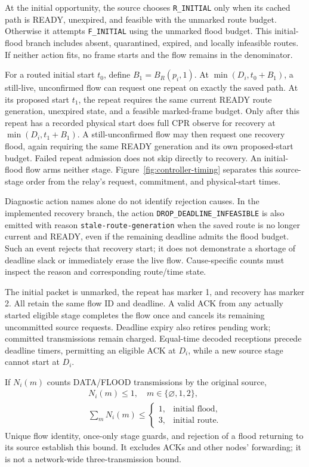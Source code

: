 At the initial opportunity, the source chooses \texttt{R\_INITIAL} only
when its cached path is READY, unexpired, and feasible with the unmarked
route budget. Otherwise it attempts \texttt{F\_INITIAL} using the unmarked
flood budget. This initial-flood branch includes absent, quarantined,
expired, and locally infeasible routes. If neither action fits, no frame
starts and the flow remains in the denominator.

For a routed initial start $t_0$, define $B_1=B_R(p_i,1)$. At
$\min(D_i,t_0+B_1)$, a still-live, unconfirmed flow can request one repeat
on exactly the saved path. At its proposed start $t_1$, the repeat requires
the same current READY route generation, unexpired state, and a feasible
marked-frame budget. Only after this repeat has a recorded physical start
does full CPR observe for recovery at $\min(D_i,t_1+B_1)$. A still-unconfirmed
flow may then request one recovery flood, again requiring the same READY
generation and its own proposed-start budget. Failed repeat admission does
not skip directly to recovery. An initial-flood flow arms neither stage.
Figure~\ref{fig:controller-timing} separates this source-stage order from
the relay's request, commitment, and physical-start times.

Diagnostic action names alone do not identify rejection causes. In the
implemented recovery branch, the action
\texttt{DROP\_DEADLINE\_INFEASIBLE} is also emitted with reason
\texttt{stale-route-generation} when the saved route is no longer current
and READY, even if the remaining deadline admits the flood budget. Such
an event rejects that recovery start; it does not demonstrate a shortage
of deadline slack or immediately erase the live flow. Cause-specific counts
must inspect the reason and corresponding route/time state.

The initial packet is unmarked, the repeat has marker 1, and recovery has
marker 2. All retain the same flow ID and deadline. A valid ACK from any
actually started eligible stage completes the flow once and cancels its
remaining uncommitted source requests. Deadline expiry also retires pending
work; committed transmissions remain charged. Equal-time decoded receptions
precede deadline timers, permitting an eligible ACK at $D_i$, while a new
source stage cannot start at $D_i$.

If $N_i(m)$ counts DATA/FLOOD transmissions by the original source,
\begin{equation}
\begin{gathered}
N_i(m)\le1,\quad m\in\{\varnothing,1,2\},\\
\sum_mN_i(m)\le
\begin{cases}1,&\text{initial flood},\\3,&\text{initial route}.
\end{cases}
\end{gathered}
\label{eq:source-bound}
\end{equation}
Unique flow identity, once-only stage guards, and rejection of a flood
returning to its source establish this bound. It excludes ACKs and other
nodes' forwarding; it is not a network-wide three-transmission bound.

